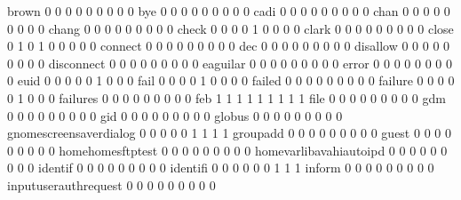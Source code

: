 \documentclass[compress,8pt]{beamer}
\begin{document}
\begin{frame}
\begin{Schunk}
  brown                                      0   0   0   0   0   0   0   0   0
  bye                                        0   0   0   0   0   0   0   0   0
  cadi                                       0   0   0   0   0   0   0   0   0
  chan                                       0   0   0   0   0   0   0   0   0
  chang                                      0   0   0   0   0   0   0   0   0
  check                                      0   0   0   0   1   0   0   0   0
  clark                                      0   0   0   0   0   0   0   0   0
  close                                      0   1   0   1   0   0   0   0   0
  connect                                    0   0   0   0   0   0   0   0   0
  dec                                        0   0   0   0   0   0   0   0   0
  disallow                                   0   0   0   0   0   0   0   0   0
  disconnect                                 0   0   0   0   0   0   0   0   0
  eaguilar                                   0   0   0   0   0   0   0   0   0
  error                                      0   0   0   0   0   0   0   0   0
  euid                                       0   0   0   0   0   1   0   0   0
  fail                                       0   0   0   0   1   0   0   0   0
  failed                                     0   0   0   0   0   0   0   0   0
  failure                                    0   0   0   0   0   1   0   0   0
  failures                                   0   0   0   0   0   0   0   0   0
  feb                                        1   1   1   1   1   1   1   1   1
  file                                       0   0   0   0   0   0   0   0   0
  gdm                                        0   0   0   0   0   0   0   0   0
  gid                                        0   0   0   0   0   0   0   0   0
  globus                                     0   0   0   0   0   0   0   0   0
  gnomescreensaverdialog                     0   0   0   0   0   1   1   1   1
  groupadd                                   0   0   0   0   0   0   0   0   0
  guest                                      0   0   0   0   0   0   0   0   0
  homehomesftptest                           0   0   0   0   0   0   0   0   0
  homevarlibavahiautoipd                     0   0   0   0   0   0   0   0   0
  identif                                    0   0   0   0   0   0   0   0   0
  identifi                                   0   0   0   0   0   0   1   1   1
  inform                                     0   0   0   0   0   0   0   0   0
  inputuserauthrequest                       0   0   0   0   0   0   0   0   0

\end{Schunk}
\end{frame}
\end{document}
